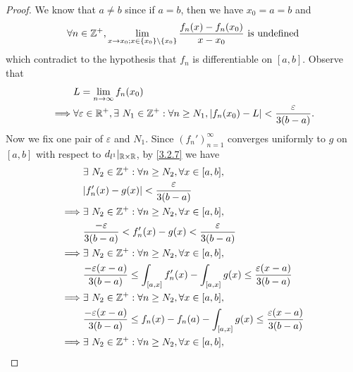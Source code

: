 \begin{proof}
  We know that \(a \neq b\) since if \(a = b\), then we have \(x_0 = a = b\) and
  \[
    \forall n \in \mathbb{Z}^+, \lim_{x \to x_0; x \in \{x_0\} \setminus \{x_0\}} \dfrac{f_n(x) - f_n(x_0)}{x - x_0} \text{ is undefined}
  \]
  which contradict to the hypothesis that \(f_n\) is differentiable on \([a, b]\).
  Observe that
  \begin{align*}
             & L = \lim_{n \to \infty} f_n(x_0)                                                                                              \\
    \implies & \forall \varepsilon \in \mathbb{R}^+, \exists\ N_1 \in \mathbb{Z}^+ : \forall n \geq N_1, \left\lvert f_n(x_0) - L\right\rvert < \dfrac{\varepsilon}{3(b - a)}.
  \end{align*}
  Now we fix one pair of \(\varepsilon\) and \(N_1\).
  Since \((f_n')_{n = 1}^\infty\) converges uniformly to \(g\) on \([a, b]\) with respect to \(d_{l^1}|_{\mathbb{R} \times \mathbb{R}}\), by \cref{3.2.7} we have
  \begin{align*}
             & \exists\ N_2 \in \Z^+ : \forall n \geq N_2, \forall x \in [a, b],                                                                 \\
             & \abs{f_n'(x) - g(x)} < \dfrac{\varepsilon}{3(b - a)}                                                                              \\
    \implies & \exists\ N_2 \in \Z^+ : \forall n \geq N_2, \forall x \in [a, b],                                                                 \\
             & \dfrac{-\varepsilon}{3(b - a)} < f_n'(x) - g(x) < \dfrac{\varepsilon}{3(b - a)}                                                   \\
    \implies & \exists\ N_2 \in \Z^+ : \forall n \geq N_2, \forall x \in [a, b],                                                                 \\
             & \dfrac{-\varepsilon (x - a)}{3(b - a)} \leq \int_{[a, x]} f_n'(x) - \int_{[a, x]} g(x) \leq \dfrac{\varepsilon (x - a)}{3(b - a)} \\
    \implies & \exists\ N_2 \in \Z^+ : \forall n \geq N_2, \forall x \in [a, b],                                                                 \\
             & \dfrac{-\varepsilon (x - a)}{3(b - a)} \leq f_n(x) - f_n(a) - \int_{[a, x]} g(x) \leq \dfrac{\varepsilon (x - a)}{3(b - a)}       \\
    \implies & \exists\ N_2 \in \Z^+ : \forall n \geq N_2, \forall x \in [a, b],                                                                 \\

\end{align*}
\end{proof}
